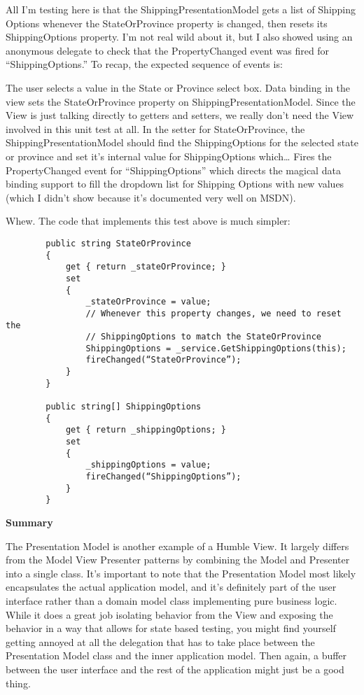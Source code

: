 \documentclass{article}
\begin{document}
{All I'm testing here is that the ShippingPresentationModel gets a list of Shipping Options whenever the StateOrProvince property is changed, then resets its ShippingOptions property.  I'm not real wild about it, but I also showed using an anonymous delegate to check that the PropertyChanged event was fired for “ShippingOptions.”  To recap, the expected sequence of events is:

    The user selects a value in the State or Province select box.
    Data binding in the view sets the StateOrProvince property on ShippingPresentationModel.  Since the View is just talking directly to getters and setters, we really don't need the View involved in this unit test at all.
    In the setter for StateOrProvince, the ShippingPresentationModel should find the ShippingOptions for the selected state or province and set it's internal value for ShippingOptions which…
    Fires the PropertyChanged event for “ShippingOptions” which directs the magical data binding support to fill the dropdown list for Shipping Options with new values (which I didn't show because it's documented very well on MSDN).

Whew.  The code that implements this test above is much simpler:
\newpage
\begin{lstlisting}
        public string StateOrProvince
        {
            get { return _stateOrProvince; }
            set
            {
                _stateOrProvince = value;
                // Whenever this property changes, we need to reset the
                // ShippingOptions to match the StateOrProvince
                ShippingOptions = _service.GetShippingOptions(this);
                fireChanged(“StateOrProvince”);
            }
        }

        public string[] ShippingOptions
        {
            get { return _shippingOptions; }
            set
            {
                _shippingOptions = value;
                fireChanged(“ShippingOptions”);
            }
        }
\end{lstlisting}
 
\Large {\textbf{Summary}}

The Presentation Model is another example of a Humble View.  It largely differs from the Model View Presenter patterns by combining the Model and Presenter into a single class.  It's important to note that the Presentation Model most likely encapsulates the actual application model, and it's definitely part of the user interface rather than a domain model class implementing pure business logic.  While it does a great job isolating behavior from the View and exposing the behavior in a way that allows for state based testing, you might find yourself getting annoyed at all the delegation that has to take place between the Presentation Model class and the inner application model.  Then again, a buffer between the user interface and the rest of the application might just be a good thing.

}
\end{document}
